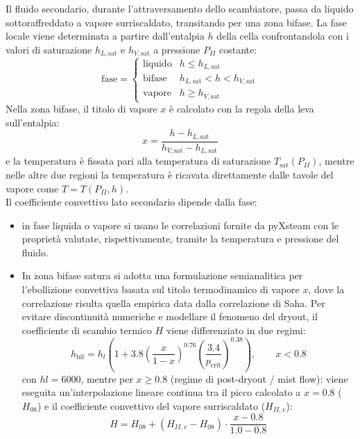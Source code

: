 \documentclass[12pt]{report}
\begin{document}
Il fluido secondario, durante l'attraversamento dello scambiatore, passa da liquido sottoraffreddato a vapore surriscaldato, transitando per una zona bifase. La fase locale viene determinata a partire dall'entalpia $h$ della cella confrontandola con i valori di saturazione $h_{L,\text{sat}}$ e $h_{V,\text{sat}}$ a pressione $P_{II}$ costante:
\begin{equation}
    \text{fase} =
    \begin{cases}
        \text{liquido} & h \le h_{L,\text{sat}} \\
        \text{bifase} & h_{L,\text{sat}} < h < h_{V,\text{sat}} \\
        \text{vapore} & h \ge h_{V,\text{sat}}
    \end{cases}
    \label{eq:fasi}
\end{equation}
Nella zona bifase, il titolo di vapore $x$ è calcolato con la regola della leva sull'entalpia:
\begin{equation}
    x = \frac{h - h_{L,\text{sat}}}{h_{V,\text{sat}} - h_{L,\text{sat}}}
    \label{eq:titolo}
\end{equation}
e la temperatura è fissata pari alla temperatura di saturazione $T_{\text{sat}}(P_{II})$, mentre nelle altre due regioni la temperatura è ricavata direttamente dalle tavole del vapore come $T = T(P_{II}, h)$.\\
Il coefficiente convettivo lato secondario dipende dalla fase:
\begin{itemize}
    \item in fase liquida o vapore si usano le correlazioni fornite da pyXsteam con le proprietà valutate, rispettivamente, tramite la temperatura e pressione del fluido.
    \item In zona bifase satura si adotta una formulazione semianalitica per l'ebollizione convettiva basata sul titolo termodinamico di vapore $x$, dove la correlazione risulta quella empirica data dalla correlazione di Saha. Per evitare discontinuità numeriche e modellare il fenomeno del dryout, il coefficiente di scambio termico $H$ viene differenziato in due regimi:
    \begin{equation}
        h_{\text{bif}} = h_l\left(1 + 3.8\left(\frac{x}{1-x}\right)^{0.76}\left(\frac{3.4}{p_{\text{crit}}}\right)^{0.38}\right), \qquad x<0.8
        \label{eq:saha}
    \end{equation}
    con $hl = 6000$, mentre per $x \ge 0.8$ (regime di post-dryout / mist flow): viene eseguita un'interpolazione lineare continua tra il picco calcolato a $x = 0.8$ ($H_{08}$) e il coefficiente convettivo del vapore surriscaldato ($H_{II,v}$):
     $$H = H_{08} + (H_{II,v} - H_{08}) \cdot \frac{x - 0.8}{1.0 - 0.8}$$
     \end{itemize}
\end{document}
